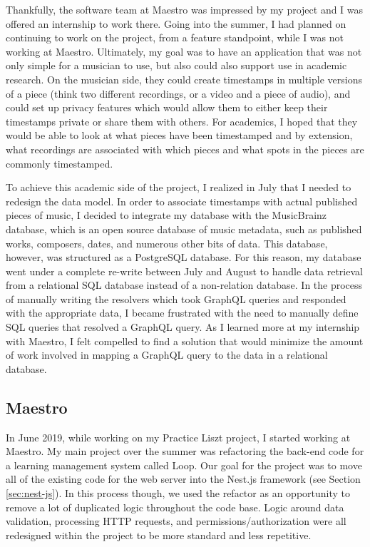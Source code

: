Thankfully, the software team at Maestro was impressed by my project and I was offered an internship to work there. Going into the summer, I had planned on continuing to work on the project, from a feature standpoint, while I was not working at Maestro.  Ultimately, my goal was to have an application that was not only simple for a musician to use, but also could also support use in academic research. On the musician side, they could create timestamps in multiple versions of a piece (think two different recordings, or a video and a piece of audio), and could set up privacy features which would allow them to either keep their timestamps private or share them with others.  For academics, I hoped that they would be able to look at what pieces have been timestamped and by extension, what recordings are associated with which pieces and what spots in the pieces are commonly timestamped.

To achieve this academic side of the project, I realized in July that I needed to redesign the data model.  In order to associate timestamps with actual published pieces of music, I decided to integrate my database with the MusicBrainz database, which is an open source database of music metadata, such as published works, composers, dates, and numerous other bits of data.  This database, however, was structured as a PostgreSQL database.  For this reason, my database went under a complete re-write between July and August to handle data retrieval from a relational SQL database instead of a non-relation database.  In the process of manually writing the resolvers which took GraphQL queries and responded with the appropriate data, I became frustrated with the need to manually define SQL queries that resolved a GraphQL query.  As I learned more at my internship with Maestro, I felt compelled to find a solution that would minimize the amount of work involved in mapping a GraphQL query to the data in a relational database.

\subsection{Maestro}
In June 2019, while working on my Practice Liszt project, I started working at Maestro. My main project over the summer was refactoring the back-end code for a learning management system called Loop.  Our goal  for the project was to move all of the existing code for the web server into the Nest.js framework (see Section \ref{sec:nest-js}).  In this process though, we used the refactor as an opportunity to remove a lot of duplicated logic throughout the code base.  Logic around data validation, processing HTTP requests, and permissions/authorization were all redesigned within the project to be more standard and less repetitive.


